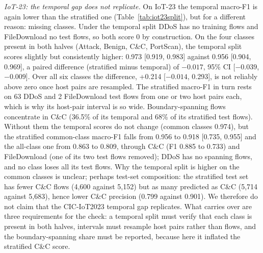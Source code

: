 \emph{IoT-23: the temporal gap does not replicate.} On IoT-23 the temporal macro-F1 is again lower than the stratified one (Table~\ref{tab:iot23split}), but for a different reason: missing classes. Under the temporal split DDoS has no training flows and FileDownload no test flows, so both score 0 by construction. On the four classes present in both halves (Attack, Benign, C\&C, PortScan), the temporal split scores slightly but consistently higher: 0.973 [0.919, 0.983] against 0.956 [0.904, 0.969], a paired difference (stratified minus temporal) of $-0.017$, 95\% CI [$-0.039$, $-0.009$]. Over all six classes the difference, +0.214 [$-0.014$, 0.293], is not reliably above zero once host pairs are resampled. The stratified macro-F1 in turn rests on 63 DDoS and 2 FileDownload test flows from one or two host pairs each, which is why its host-pair interval is so wide. Boundary-spanning flows concentrate in C\&C (36.5\% of its temporal and 68\% of its stratified test flows). Without them the temporal scores do not change (common classes 0.974), but the stratified common-class macro-F1 falls from 0.956 to 0.918 [0.735, 0.955] and the all-class one from 0.863 to 0.809, through C\&C (F1 0.885 to 0.733) and FileDownload (one of its two test flows removed); DDoS has no spanning flows, and no class loses all its test flows. Why the temporal split is higher on the common classes is unclear; perhaps test-set composition: the stratified test set has fewer C\&C flows (4,600 against 5,152) but as many predicted as C\&C (5,714 against 5,683), hence lower C\&C precision (0.799 against 0.901). We therefore do not claim that the CIC-IoT2023 temporal gap replicates. What carries over are three requirements for the check: a temporal split must verify that each class is present in both halves, intervals must resample host pairs rather than flows, and the boundary-spanning share must be reported, because here it inflated the stratified C\&C score.
